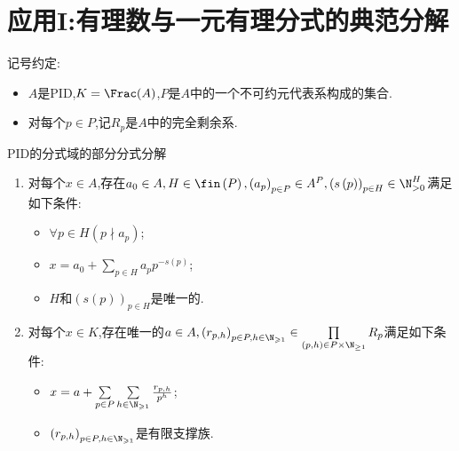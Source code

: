 \section{应用I:有理数与一元有理分式的典范分解}

记号约定:
\begin{itemize}
	\item $A$是PID,$K=\Frac(A)$,$P$是$A$中的一个不可约元代表系构成的集合.
	\item 对每个$p\in P$,记$R_{p}$是$A$中的完全剩余系.
\end{itemize}

\begin{theorem}{PID的分式域的部分分式分解}{}
	\begin{enumerate}
		\item 对每个$x\in A$,存在$a_{0}\in A,H\in\fin\left(P\right),\left(a_{p}\right)_{p\in P}\in A^{P},\left(s\left(p\right)\right)_{p\in H}\in\N_{>0}^{H}$满足如下条件:
		\begin{itemize}
			\item $\forall p\in H\left(p\nmid a_{p}\right)$;
			\item $x=a_{0}+\sum\limits_{p\in H}a_{p}p^{-s\left(p\right)}$;
			\item $H$和$\left(s\left(p\right)\right)_{p\in H}$是唯一的.
		\end{itemize}
		\item 对每个$x\in K$,存在唯一的$a\in A,\left(r_{p,h}\right)_{p\in P,h\in\N_{\geqslant 1}}\in\prod\limits_{\left(p,h\right)\in P\times\N_{\geq 1}}R_{p}$满足如下条件:
		\begin{itemize}
			\item $x=a+\sum\limits_{p\in P}\sum\limits_{h\in\N_{\geqslant 1}}\frac{r_{p,h}}{p^{h}}$;
			\item $\left(r_{p,h}\right)_{p\in P,h\in\N_{\geqslant 1}}$是有限支撑族.
		\end{itemize}
	\end{enumerate}
\end{theorem}

